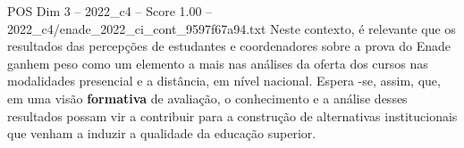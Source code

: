 \begin{textsample}{POS Dim 3 – 2022\_c4 – Score 1.00 – 2022\_c4/enade\_2022\_ci\_cont\_9597f67a94.txt}
Neste contexto, é relevante que os resultados das percepções de estudantes e coordenadores sobre a prova do Enade ganhem peso como um elemento a mais nas análises da oferta dos cursos nas modalidades presencial e a distância, em nível nacional.
Espera -se, assim, que, em uma visão \textbf{formativa} de avaliação, o conhecimento e a análise desses resultados possam vir a contribuir para a construção de alternativas institucionais que venham a induzir a qualidade da educação superior.

\end{textsample}
